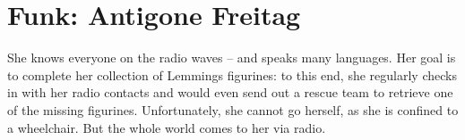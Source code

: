 \newpage

\section{Funk: Antigone Freitag}

She knows everyone on the radio waves – and speaks many languages. Her goal is to complete her collection of Lemmings figurines: to this end, she regularly checks in with her radio contacts and would even send out a rescue team to retrieve one of the missing figurines. Unfortunately, she cannot go herself, as she is confined to a wheelchair. But the whole world comes to her via radio.

\newpage
\begin{npcBox}[title=Antigone]

    \begin{aspects}
    \item {}
    \item {}
    \item {}
    \item {}
    \end{aspects}

    \begin{skills}
    \item {}
    \item {}
    \item {}
    \item {}
    \item {}
    \item {}
    \item {}
    \item {}
    \item {}
    \item {}
    \item {}
    \item {}
    \item {}
    \item {}
    \item {}
    \item {}
    \item {}
    \item {}
    \item {}
    \end{skills}


\end{npcBox}
